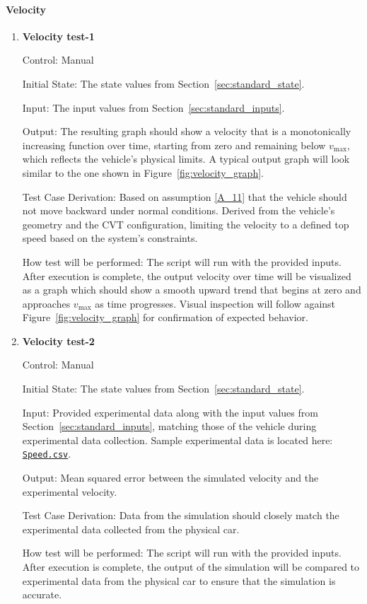 \documentclass[12pt, titlepage]{article}
\newcommand{\refdata}[2]{
  \href{https://github.com/gr812b/CVT-Simulator/blob/main/experimental-data/#1
  }{\texttt{#2}}}
\begin{document}
\paragraph{Velocity}

\begin{enumerate}

  \item {} \hypertarget{Velocity test-1}{\textbf{Velocity test-1}} \label{Velocity test-1}

Control: Manual
					
Initial State: The state values from Section~\ref{sec:standard_state}.

Input: The input values from Section~\ref{sec:standard_inputs}.
					
Output: The resulting graph should show a velocity that is a monotonically increasing function over time, starting from zero and remaining below $v_\text{max}$, which reflects the vehicle’s physical limits. A typical output graph will look similar to the one shown in Figure~\ref{fig:velocity_graph}.

Test Case Derivation: Based on assumption \ref{A_11} that the vehicle should not move backward under normal conditions.
Derived from the vehicle’s geometry and the CVT configuration, limiting the velocity to a defined top speed based on the system’s constraints.


How test will be performed: The script will run with the provided inputs. After execution is complete, the output velocity over time will be visualized as a graph which should show a smooth upward trend that begins at zero and approaches $v_\text{max}$ as time progresses. Visual inspection will follow against Figure~\ref{fig:velocity_graph} for confirmation of expected behavior.
					
\item {} \hypertarget{Velocity test-2}{\textbf{Velocity test-2}} \label{Velocity test-2}

Control: Manual

Initial State: The state values from Section~\ref{sec:standard_state}.

Input: Provided experimental data along with the input values from Section~\ref{sec:standard_inputs}, matching those of the vehicle during experimental data collection. Sample experimental data is located here: \refdata{GPS\%20SPEED.csv}{Speed.csv}.

Output: Mean squared error between the simulated velocity and the experimental velocity.

Test Case Derivation: Data from the simulation should closely match the experimental data collected from the physical car.

How test will be performed: The script will run with the provided inputs. After execution is complete, the output of the simulation will be compared to experimental data from the physical car to ensure that the simulation is accurate.

\end{enumerate}
\end{document}
